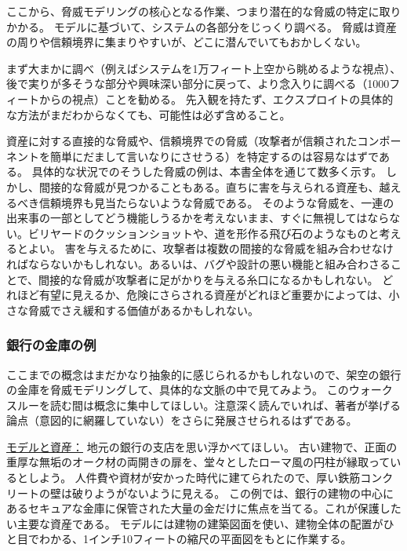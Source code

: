 \documentclass[uplatex]{jsarticle}
\def\label#1{}%
\begin{document}
ここから、脅威モデリングの核心となる作業、つまり潜在的な脅威の特定に取りかかる。
モデルに基づいて、システムの各部分をじっくり調べる。
脅威は資産の周りや信頼境界に集まりやすいが、どこに潜んでいてもおかしくない。

まず大まかに調べ（例えばシステムを1万フィート上空から眺めるような視点）、後で実りが多そうな部分や興味深い部分に戻って、より念入りに調べる（1000フィートからの視点）ことを勧める。
先入観を持たず、エクスプロイトの具体的な方法がまだわからなくても、可能性は必ず含めること。

資産に対する直接的な脅威や、信頼境界での脅威（攻撃者が信頼されたコンポーネントを簡単にだまして言いなりにさせうる）を特定するのは容易なはずである。
具体的な状況でのそうした脅威の例は、本書全体を通じて数多く示す。
しかし、間接的な脅威が見つかることもある。直ちに害を与えられる資産も、越えるべき信頼境界も見当たらないような脅威である。
そのような脅威を、一連の出来事の一部としてどう機能しうるかを考えないまま、すぐに無視してはならない。ビリヤードのクッションショットや、道を形作る飛び石のようなものと考えるとよい。
害を与えるために、攻撃者は複数の間接的な脅威を組み合わせなければならないかもしれない。あるいは、バグや設計の悪い機能と組み合わさることで、間接的な脅威が攻撃者に足がかりを与える糸口になるかもしれない。
どれほど有望に見えるか、危険にさらされる資産がどれほど重要かによっては、小さな脅威でさえ緩和する価値があるかもしれない。

\subsubsection{銀行の金庫の例}\label{subsec:ch2-bank-vault}

ここまでの概念はまだかなり抽象的に感じられるかもしれないので、架空の銀行の金庫を脅威モデリングして、具体的な文脈の中で見てみよう。
このウォークスルーを読む間は概念に集中してほしい。注意深く読んでいれば、著者が挙げる論点（意図的に網羅していない）をさらに発展させられるはずである。

\underline{モデルと資産：}
地元の銀行の支店を思い浮かべてほしい。
古い建物で、正面の重厚な無垢のオーク材の両開きの扉を、堂々としたローマ風の円柱が縁取っているとしよう。
人件費や資材が安かった時代に建てられたので、厚い鉄筋コンクリートの壁は破りようがないように見える。
この例では、銀行の建物の中心にあるセキュアな金庫に保管された大量の金だけに焦点を当てる。これが保護したい主要な資産である。
モデルには建物の建築図面を使い、建物全体の配置がひと目でわかる、1インチ10フィートの縮尺の平面図をもとに作業する。
\end{document}
